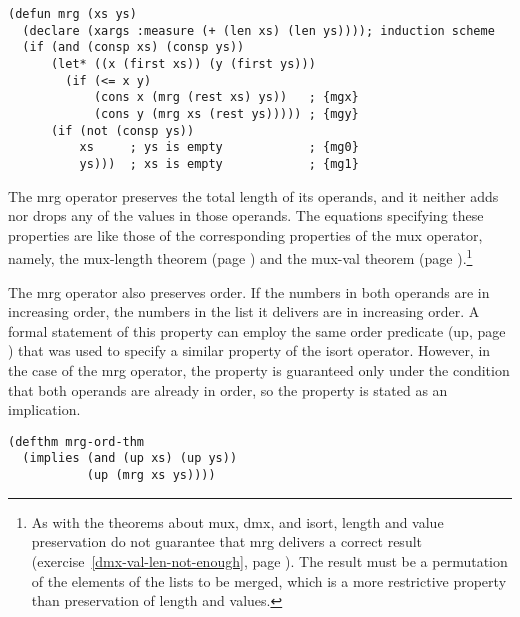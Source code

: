 \label{defun:mrg}
\begin{code}
\begin{verbatim}
(defun mrg (xs ys)
  (declare (xargs :measure (+ (len xs) (len ys)))); induction scheme
  (if (and (consp xs) (consp ys))
      (let* ((x (first xs)) (y (first ys)))
        (if (<= x y)
            (cons x (mrg (rest xs) ys))   ; {mgx}
            (cons y (mrg xs (rest ys))))) ; {mgy}
      (if (not (consp ys))
          xs     ; ys is empty            ; {mg0}
          ys)))  ; xs is empty            ; {mg1}
\end{verbatim}
\end{code}

The \textsf{mrg} operator preserves the total length of its operands,
and it neither adds nor drops any of the values in those operands.
The equations specifying these properties are like those of the
corresponding properties of the \textsf{mux} operator, namely,
the mux-length theorem (page \pageref{mux-length-thm}) and the
mux-val theorem (page \pageref{thm:mux-val}).\footnote{As
with the theorems about
\textsf{mux}, \textsf{dmx}, and \textsf{isort}, length and value preservation
do not guarantee that \textsf{mrg} delivers a correct result
(exercise~\ref{dmx-val-len-not-enough}, page \pageref{dmx-val-len-not-enough}).
The result must be a permutation
of the elements of the lists to be merged,
which is a more restrictive property than
preservation of length and values.}

The \textsf{mrg} operator also preserves order.
If the numbers in both operands are in increasing order,
the numbers in the list it delivers are in increasing order.
A formal statement of this property can employ the same order predicate
(\textsf{up}, page \pageref{defun:up}) that was used to specify a
similar property of the \textsf{isort} operator.
However, in the case of the \textsf{mrg} operator,
the property is guaranteed only under the condition
that both operands are already in order,
so the property is stated as an implication.
\label{defthm:mrg-ord}
\begin{code}
\begin{verbatim}
(defthm mrg-ord-thm
  (implies (and (up xs) (up ys))
           (up (mrg xs ys))))
\end{verbatim}
\end{code}

